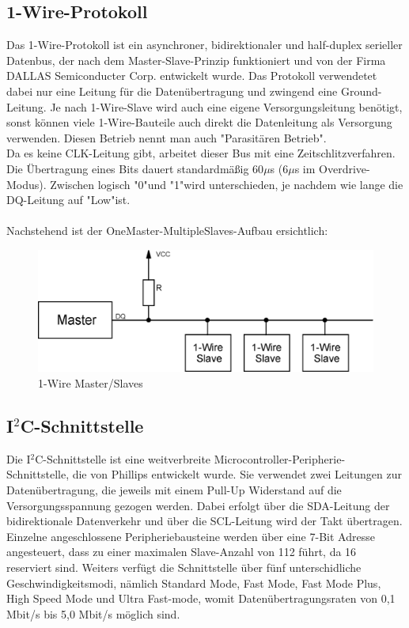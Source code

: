 \documentclass[12pt,a4paper]{article}
\begin{document}
\subsection{1-Wire-Protokoll}
Das 1-Wire-Protokoll ist ein asynchroner, bidirektionaler und half-duplex serieller Datenbus, der nach dem Master-Slave-Prinzip funktioniert und von der Firma DALLAS Semiconducter Corp. entwickelt wurde. Das Protokoll verwendetet dabei nur eine Leitung für die Datenübertragung und zwingend eine Ground-Leitung. Je nach 1-Wire-Slave wird auch eine eigene Versorgungsleitung benötigt, sonst können viele 1-Wire-Bauteile auch direkt die Datenleitung als Versorgung verwenden. Diesen Betrieb nennt man auch "Parasitären Betrieb". \\
Da es keine CLK-Leitung gibt, arbeitet dieser Bus mit eine Zeitschlitzverfahren. Die Übertragung eines Bits dauert standardmäßig 60$\mu$s (6$\mu$s im Overdrive-Modus). Zwischen logisch "0"\space und "1"\space wird unterschieden, je nachdem wie lange die DQ-Leitung auf "Low"\space ist. \\
\\Nachstehend ist der OneMaster-MultipleSlaves-Aufbau ersichtlich:

\begin{figure}[H]
	\centering
	\includegraphics[width=0.9\linewidth]{one_wire.eps}
	\caption{1-Wire Master/Slaves}
	\label{figure:onewire}
\end{figure}

\pagebreak

\subsection{I$^2$C-Schnittstelle}
Die I$^2$C-Schnittstelle ist eine weitverbreite Microcontroller-Peripherie-Schnittstelle, die von Phillips entwickelt wurde. Sie verwendet zwei Leitungen zur Datenübertragung, die jeweils mit einem Pull-Up Widerstand auf die Versorgungsspannung gezogen werden. Dabei erfolgt über die SDA-Leitung der bidirektionale Datenverkehr und über die SCL-Leitung wird der Takt übertragen. \\ Einzelne angeschlossene Peripheriebausteine werden über eine 7-Bit Adresse angesteuert, dass zu einer maximalen Slave-Anzahl von 112 führt, da 16 reserviert sind. Weiters verfügt die Schnittstelle über fünf unterschidliche Geschwindigkeitsmodi, nämlich Standard Mode, Fast Mode, Fast Mode Plus, High Speed Mode und Ultra Fast-mode, womit Datenübertragungsraten von 0,1 Mbit/s bis 5,0 Mbit/s möglich sind.
\end{document}
